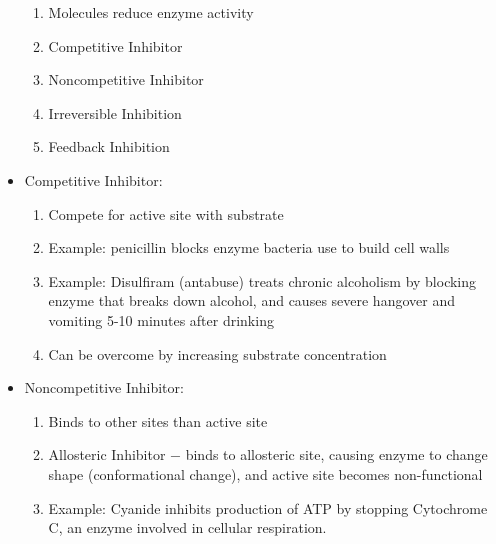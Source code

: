 \documentclass[12pt]{article}
\begin{document}
\begin{itemize}
\begin{enumerate}
      \item Molecules reduce enzyme activity

      \item Competitive Inhibitor

      \item Noncompetitive Inhibitor

      \item Irreversible Inhibition

      \item Feedback Inhibition

    \end{enumerate}

  \item Competitive Inhibitor:

    \begin{enumerate}

      \item Compete for active site with substrate

      \item Example: penicillin blocks enzyme bacteria use to build cell walls

      \item Example: Disulfiram (antabuse) treats chronic alcoholism by blocking enzyme that breaks down alcohol, and causes severe hangover and vomiting 5-10 minutes after drinking

      \item Can be overcome by increasing substrate concentration

    \end{enumerate}

  \item Noncompetitive Inhibitor:

    \begin{enumerate}

      \item Binds to other sites than active site

      \item Allosteric Inhibitor $-$ binds to allosteric site, causing enzyme to change shape (conformational change), and active site becomes non-functional

      \item Example: Cyanide inhibits production of ATP by stopping Cytochrome C, an enzyme involved in cellular respiration.

    \end{enumerate}


\end{itemize}
\end{document}
